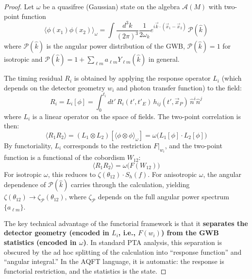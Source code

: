 \documentclass[11pt,a4paper]{article}
\begin{document}
\begin{proof}
Let $\omega$ be a quasifree (Gaussian) state on the algebra $\mathcal{A}(M)$ with two-point function
\begin{equation}
\langle \phi(x_1) \phi(x_2) \rangle_\omega = \int \frac{d^3k}{(2\pi)^3} \frac{1}{2\omega_k} e^{i\vec{k}\cdot(\vec{x}_1-\vec{x}_2)} \, \mathcal{P}(\hat{k})
\end{equation}
where $\mathcal{P}(\hat{k})$ is the angular power distribution of the GWB, $\mathcal{P}(\hat{k}) = 1$ for isotropic and $\mathcal{P}(\hat{k}) = 1 + \sum_{\ell m} a_{\ell m} Y_{\ell m}(\hat{k})$ in general.

The timing residual $R_i$ is obtained by applying the response operator $L_i$ (which depends on the detector geometry $w_i$ and photon transfer function) to the field:
\begin{equation}
R_i = L_i[\phi] = \int_0^{t_i} dt' \, R_i(t', t'_E) \, h_{ij}(t', \vec{x}_P) \, \hat{n}^i \hat{n}^j
\end{equation}
where $L_i$ is a linear operator on the space of fields. The two-point correlation is then:
\begin{equation}
\langle R_1 R_2 \rangle = (L_1 \otimes L_2)[\langle \phi \otimes \phi \rangle_\omega] = \omega\bigl(L_1[\phi] \cdot L_2[\phi]\bigr)
\end{equation}
By functoriality, $L_i$ corresponds to the restriction $F|_{w_i}$, and the two-point function is a functional of the cobordism $W_{12}$:
\begin{equation}
\langle R_1 R_2 \rangle = \omega\bigl(F(W_{12})\bigr)
\end{equation}
For isotropic $\omega$, this reduces to $\zeta(\theta_{12}) \cdot S_h(f)$. For anisotropic $\omega$, the angular dependence of $\mathcal{P}(\hat{k})$ carries through the calculation, yielding $\zeta(\theta_{12}) \to \zeta_{\mathcal{P}}(\theta_{12})$, where $\zeta_{\mathcal{P}}$ depends on the full angular power spectrum $\{a_{\ell m}\}$.

The key technical advantage of the functorial framework is that it \textbf{separates the detector geometry (encoded in $L_i$, i.e., $F(w_i)$) from the GWB statistics (encoded in $\omega$)}. In standard PTA analysis, this separation is obscured by the ad hoc splitting of the calculation into ``response function'' and ``angular integral.'' In the AQFT language, it is automatic: the response is functorial restriction, and the statistics is the state.
\end{proof}
\end{document}
